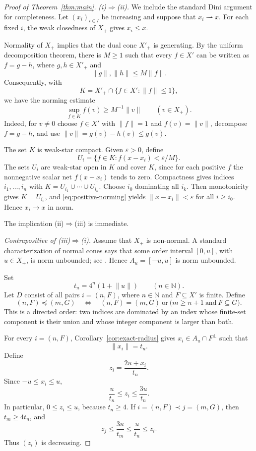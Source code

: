 \documentclass[11pt]{article}
\theoremstyle{remark}
\newcommand{\N}{\mathbb{N}}
\newcommand{\norm}[1]{\lVert #1\rVert}
\begin{document}
\begin{proof}[Proof of Theorem~\ref{thm:main}]
\emph{(i)$\Rightarrow$(ii).}
We include the standard Dini argument for completeness.  Let
$(x_i)_{i\in I}$ be increasing and suppose that $x_i\rightharpoonup x$.
For each fixed $i$, the weak closedness of $X_+$ gives $x_i\leq x$.

Normality of $X_+$ implies that the dual cone $X'_+$ is generating.  By the
uniform decomposition theorem, there is $M\geq1$ such that every
$f\in X'$ can be written as $f=g-h$, where $g,h\in X'_+$ and
\[
 \norm{g},\norm{h}\leq M\norm{f}.
\]
Consequently, with
\[
 K=X'_+\cap\{f\in X':\norm{f}\leq1\},
\]
we have the norming estimate
\begin{equation}\label{eq:positive-norming}
  \sup_{f\in K}f(v)\geq M^{-1}\norm{v}
  \qquad(v\in X_+).
\end{equation}
Indeed, for $v\neq0$ choose $f\in X'$ with $\norm{f}=1$ and
$f(v)=\norm{v}$, decompose $f=g-h$, and use
$\norm{v}=g(v)-h(v)\leq g(v)$.

The set $K$ is weak-star compact.  Given $\varepsilon>0$, define
\[
 U_i=\{f\in K:f(x-x_i)<\varepsilon/M\}.
\]
The sets $U_i$ are weak-star open in $K$ and cover $K$, since for each
positive $f$ the nonnegative scalar net $f(x-x_i)$ tends to zero.
Compactness gives indices $i_1,\ldots,i_n$ with
$K=U_{i_1}\cup\cdots\cup U_{i_n}$.  Choose $i_0$ dominating all $i_k$.
Then monotonicity gives $K=U_{i_0}$, and \eqref{eq:positive-norming}
yields $\norm{x-x_i}<\varepsilon$ for all $i\geq i_0$.  Hence
$x_i\to x$ in norm.

The implication (ii)$\Rightarrow$(iii) is immediate.

\emph{Contrapositive of (iii)$\Rightarrow$(i).}
Assume that $X_+$ is non-normal.  A standard characterization of normal
cones says that some order interval $[0,u]$, with $u\in X_+$, is norm
unbounded; see \cite[Theorem~2.40]{AliprantisTourky2007}.  Hence
$A_u=[-u,u]$ is norm unbounded.

Set
\[
 t_n=4^n(1+\norm{u})\qquad(n\in\N).
\]
Let $D$ consist of all pairs $i=(n,F)$, where $n\in\N$ and
$F\subseteq X'$ is finite.  Define
\[
 (n,F)\preceq(m,G)
 \quad\Longleftrightarrow\quad
 (n,F)=(m,G)
 \ \text{or}\ 
 \bigl(m\geq n+1\ \text{and}\ F\subseteq G\bigr).
\]
This is a directed order: two indices are dominated by an index whose
finite-set component is their union and whose integer component is larger
than both.

For every $i=(n,F)$, Corollary~\ref{cor:exact-radius} gives
$x_i\in A_u\cap F^\perp$ such that
\[
 \norm{x_i}=t_n.
\]
Define
\[
 z_i=\frac{2u+x_i}{t_n}.
\]
Since $-u\leq x_i\leq u$,
\begin{equation}\label{eq:z-bounds}
  \frac{u}{t_n}\leq z_i\leq\frac{3u}{t_n}.
\end{equation}
In particular, $0\leq z_i\leq u$, because $t_n\geq4$.
If $i=(n,F)\prec j=(m,G)$, then $t_m\geq4t_n$, and
\[
 z_j\leq\frac{3u}{t_m}
 \leq\frac{u}{t_n}
 \leq z_i.
\]
Thus $(z_i)$ is decreasing.


\end{proof}
\end{document}
